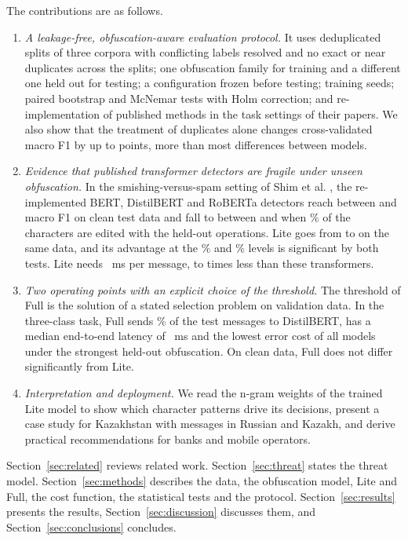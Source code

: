 The contributions are as follows.
\begin{enumerate}
\item \emph{A leakage-free, obfuscation-aware evaluation protocol.} It uses deduplicated splits of three corpora with conflicting labels resolved and no exact or near duplicates across the splits; one obfuscation family for training and a different one held out for testing; a configuration frozen before testing;  training seeds; paired bootstrap and McNemar tests with Holm correction; and re-implementation of published methods in the task settings of their papers. We also show that the treatment of duplicates alone changes cross-validated macro F1 by up to  points, more than most differences between models.
\item \emph{Evidence that published transformer detectors are fragile under unseen obfuscation.} In the smishing-versus-spam setting of Shim et al. \cite{shim2024}, the re-implemented BERT, DistilBERT and RoBERTa detectors reach between  and  macro F1 on clean test data and fall to between  and  when \% of the characters are edited with the held-out operations. Lite goes from  to  on the same data, and its advantage at the \% and \% levels is significant by both tests. Lite needs ~ms per message,  to  times less than these transformers.
\item \emph{Two operating points with an explicit choice of the threshold.} The threshold of Full is the solution of a stated selection problem on validation data. In the three-class task, Full sends \% of the test messages to DistilBERT, has a median end-to-end latency of ~ms and the lowest error cost of all models under the strongest held-out obfuscation. On clean data, Full does not differ significantly from Lite.
\item \emph{Interpretation and deployment.} We read the n-gram weights of the trained Lite model to show which character patterns drive its decisions, present a case study for Kazakhstan with messages in Russian and Kazakh, and derive practical recommendations for banks and mobile operators.
\end{enumerate}

Section~\ref{sec:related} reviews related work. Section~\ref{sec:threat} states the threat model. Section~\ref{sec:methods} describes the data, the obfuscation model, Lite and Full, the cost function, the statistical tests and the protocol. Section~\ref{sec:results} presents the results, Section~\ref{sec:discussion} discusses them, and Section~\ref{sec:conclusions} concludes.
